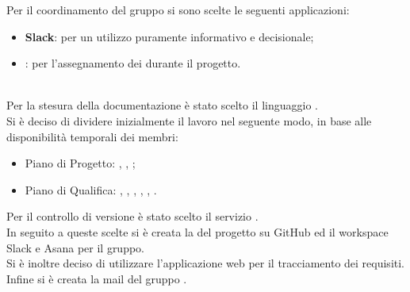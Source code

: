 Per il coordinamento del gruppo si sono scelte le seguenti applicazioni:
\begin{itemize}
\item \textbf{Slack}: per un utilizzo puramente informativo e decisionale;
\item {}: per l'assegnamento dei  durante il progetto.
\end{itemize} \\
Per la stesura della documentazione è stato scelto il linguaggio \glossaryItem{\LaTeX{}}.\\
Si è deciso di dividere inizialmente il lavoro nel seguente modo, in base alle disponibilità temporali dei membri:
\begin{itemize}
	\item Piano di Progetto: \Tommaso, \Leonardo, \Cristian;
    \item Piano di Qualifica: \Leonardo, \Isacco, \Carlo, \Mattia, \Cristian, \Tommaso.
\end{itemize}
Per il controllo di versione è stato scelto il servizio .\\
In seguito a queste scelte si è creata la  del progetto su GitHub ed il workspace Slack e Asana per il gruppo.\\
Si è inoltre deciso di utilizzare l'applicazione web  per il tracciamento dei requisiti.
Infine si è creata la mail del gruppo \GroupEmail.
